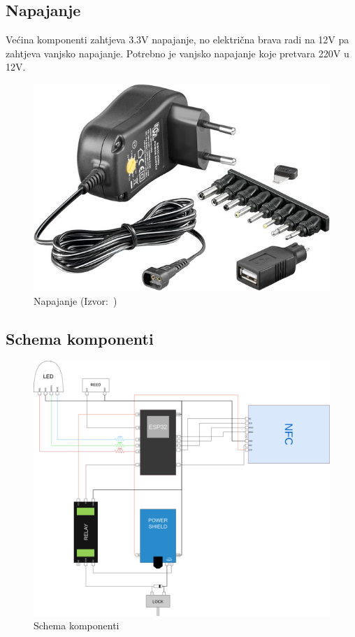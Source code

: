\pagebreak

\subsection{Napajanje}

Većina komponenti zahtjeva 3.3V napajanje, no električna brava radi na 12V pa zahtjeva vanjsko napajanje.
Potrebno je vanjsko napajanje koje pretvara 220V u 12V\@.

\begin{figure}[h!]
    \centering
    \includegraphics[scale=0.4]{images/power-supply}
    \caption{Napajanje (Izvor:~\cite{chipoteka-power-supply})}
\end{figure}

\subsection{Schema komponenti}

\begin{figure}[h!]
    \centering
    \includegraphics[width=\textwidth]{images/component-schema}
    \caption{Schema komponenti}
    \label{fig:component-schema}
\end{figure}

